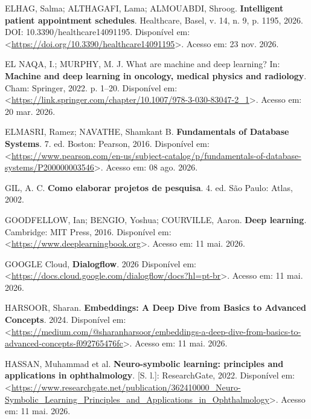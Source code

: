 \documentclass[12pt,a4paper]{extarticle}
\begin{document}
\vspace{0.5cm}\noindent
ELHAG, Salma; ALTHAGAFI, Lama; ALMOUABDI, Shroog. \textbf{Intelligent patient appointment schedules}. Healthcare, Basel, v. 14, n. 9, p. 1195, 2026. DOI: 10.3390/healthcare14091195. Disponível em: <\url{https://doi.org/10.3390/healthcare14091195}>. Acesso em: 23 nov. 2026.

\vspace{0.5cm}\noindent
EL NAQA, I.; MURPHY, M. J. What are machine and deep learning? In: \textbf{Machine and deep learning in oncology, medical physics and radiology}. Cham: Springer, 2022. p. 1--20. Disponível em: <\url{https://link.springer.com/chapter/10.1007/978-3-030-83047-2_1}>. Acesso em: 20 mar. 2026.

\vspace{0.5cm}\noindent
ELMASRI, Ramez; NAVATHE, Shamkant B. \textbf{Fundamentals of Database Systems}. 7. ed. Boston: Pearson, 2016. Disponível em: <\url{https://www.pearson.com/en-us/subject-catalog/p/fundamentals-of-database-systems/P200000003546}>. Acesso em: 08 ago. 2026.

\vspace{0.5cm}\noindent
GIL, A. C. \textbf{Como elaborar projetos de pesquisa}. 4. ed. São Paulo: Atlas, 2002.

\vspace{0.5cm}\noindent
GOODFELLOW, Ian; BENGIO, Yoshua; COURVILLE, Aaron. \textbf{Deep learning}. Cambridge: MIT Press, 2016. Disponível em: <\url{https://www.deeplearningbook.org}>. Acesso em: 11 mai. 2026.

\vspace{0.5cm}\noindent
GOOGLE Cloud, \textbf{Dialogflow}. 2026 Disponível em: <\url{https://docs.cloud.google.com/dialogflow/docs?hl=pt-br}>. Acesso em: 11 mai. 2026.

\vspace{0.5cm}\noindent
HARSOOR, Sharan. \textbf{Embeddings: A Deep Dive from Basics to Advanced Concepts}. 2024. Disponível em: <\url{https://medium.com/@sharanharsoor/embeddings-a-deep-dive-from-basics-to-advanced-concepts-f092765476fc}>. Acesso em: 11 mai. 2026.

\vspace{0.5cm}\noindent
HASSAN, Muhammad et al. \textbf{Neuro-symbolic learning: principles and applications in ophthalmology}. [S. l.]: ResearchGate, 2022. Disponível em: <\url{https://www.researchgate.net/publication/362410000_Neuro-Symbolic_Learning_Principles_and_Applications_in_Ophthalmology}>. Acesso em: 11 mai. 2026.
\end{document}
